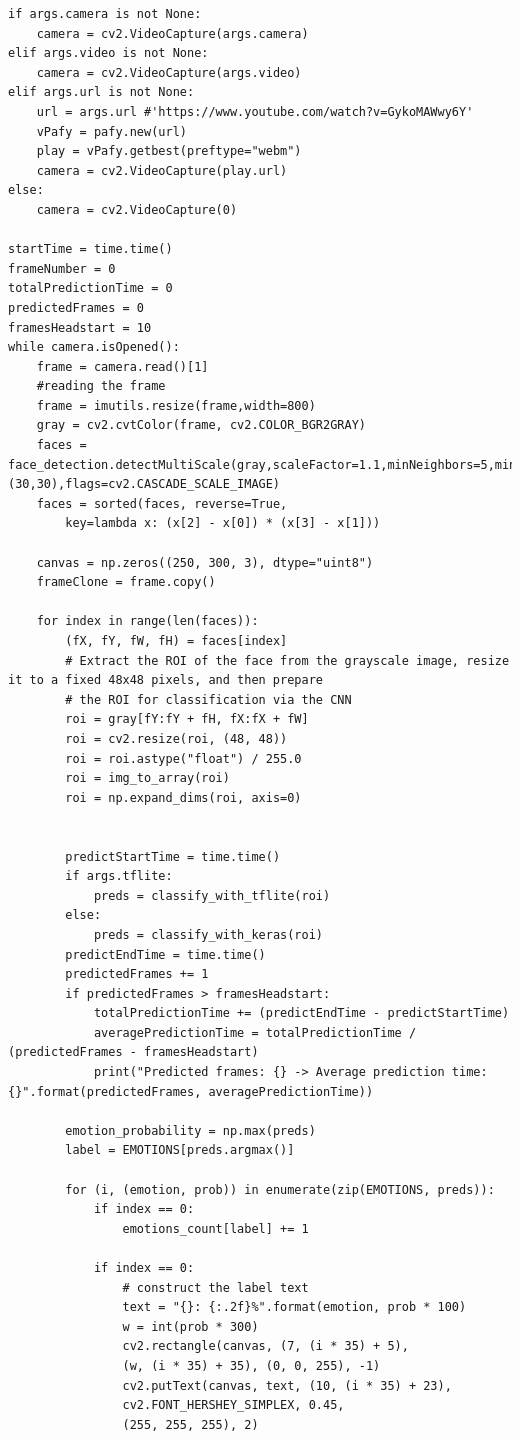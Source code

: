 \documentclass[runningheads,a4paper,11pt]{report}
\begin{document}
\begin{appendices}
\begin{lstlisting}
if args.camera is not None:
    camera = cv2.VideoCapture(args.camera)
elif args.video is not None:
    camera = cv2.VideoCapture(args.video)
elif args.url is not None:
    url = args.url #'https://www.youtube.com/watch?v=GykoMAWwy6Y'
    vPafy = pafy.new(url)
    play = vPafy.getbest(preftype="webm")
    camera = cv2.VideoCapture(play.url)
else:
    camera = cv2.VideoCapture(0)

startTime = time.time()
frameNumber = 0
totalPredictionTime = 0
predictedFrames = 0
framesHeadstart = 10
while camera.isOpened():
    frame = camera.read()[1]
    #reading the frame
    frame = imutils.resize(frame,width=800)
    gray = cv2.cvtColor(frame, cv2.COLOR_BGR2GRAY)
    faces = face_detection.detectMultiScale(gray,scaleFactor=1.1,minNeighbors=5,minSize=(30,30),flags=cv2.CASCADE_SCALE_IMAGE)
    faces = sorted(faces, reverse=True,
        key=lambda x: (x[2] - x[0]) * (x[3] - x[1]))

    canvas = np.zeros((250, 300, 3), dtype="uint8")
    frameClone = frame.copy()

    for index in range(len(faces)):
        (fX, fY, fW, fH) = faces[index]
        # Extract the ROI of the face from the grayscale image, resize it to a fixed 48x48 pixels, and then prepare
        # the ROI for classification via the CNN
        roi = gray[fY:fY + fH, fX:fX + fW]
        roi = cv2.resize(roi, (48, 48))
        roi = roi.astype("float") / 255.0
        roi = img_to_array(roi)
        roi = np.expand_dims(roi, axis=0)
        
        
        predictStartTime = time.time()
        if args.tflite:
            preds = classify_with_tflite(roi)
        else:
            preds = classify_with_keras(roi)
        predictEndTime = time.time()
        predictedFrames += 1
        if predictedFrames > framesHeadstart:
            totalPredictionTime += (predictEndTime - predictStartTime)
            averagePredictionTime = totalPredictionTime / (predictedFrames - framesHeadstart)
            print("Predicted frames: {} -> Average prediction time: {}".format(predictedFrames, averagePredictionTime))

        emotion_probability = np.max(preds)
        label = EMOTIONS[preds.argmax()]

        for (i, (emotion, prob)) in enumerate(zip(EMOTIONS, preds)):
            if index == 0: 
                emotions_count[label] += 1
            
            if index == 0:
                # construct the label text
                text = "{}: {:.2f}%".format(emotion, prob * 100)
                w = int(prob * 300)
                cv2.rectangle(canvas, (7, (i * 35) + 5),
                (w, (i * 35) + 35), (0, 0, 255), -1)
                cv2.putText(canvas, text, (10, (i * 35) + 23),
                cv2.FONT_HERSHEY_SIMPLEX, 0.45,
                (255, 255, 255), 2)
            

\end{lstlisting}
\end{appendices}
\end{document}
